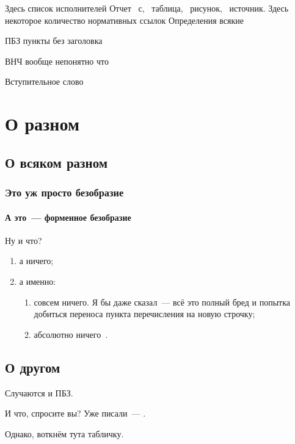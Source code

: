 \documentclass[usehyperref]{G7-32}
\begin{document}
\frontmatter
 \Executors Здесь список исполнителей
 \Referat
 Отчет \totalpages~с, \totaltables~таблица, \totalfigures~рисунок, \totalbibs~источник.
 \tableofcontents
 \NormRefs Здесь некоторое количество нормативных ссылок
 \Defines Определения всякие
 \Abbreviations
 \begin{abbreviation}
  \item[ПБЗ] пункты без заголовка
  \item[ВНЧ] вообще непонятно что
 \end{abbreviation}

 \Introduction Вступительное слово
\mainmatter

\chapter{О разном}
\ttl
\section{О всяком разном}
\ttl
\subsection{Это уж просто безобразие}
\ttl
\subsubsection{А это~--- форменное безобразие}\label{L1}
Ну и что?
\begin{enumerate}
 \item\label{L1:I1}
  а ничего;
 \item
  а именно:
  \begin{enumerate}
   \item
    совсем ничего. Я бы даже сказал~--- всё это полный бред
    и попытка добиться переноса пункта перечисления на новую строчку;
   \item
    абсолютно ничего~\cite{bib:test1}.
  \end{enumerate}
\end{enumerate}

\section{О другом}
\nsubsection Случаются и ПБЗ.

И что, спросите вы? Уже писали~--- .

Однако, воткнём тута табличку.
\end{document}
